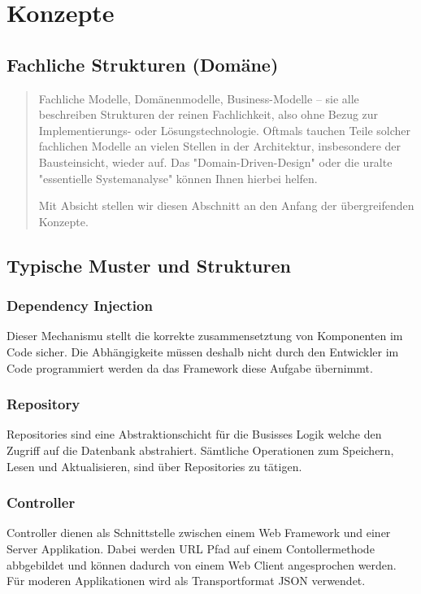\chapter{Konzepte}

\section{Fachliche Strukturen (Domäne)}

\begin{quote}
	Fachliche Modelle, Domänenmodelle, Business-Modelle – sie alle beschreiben Strukturen der reinen Fachlichkeit, also ohne Bezug zur Implementierungs- oder Lösungstechnologie.
	Oftmals tauchen Teile solcher fachlichen Modelle an vielen Stellen in der Architektur, insbesondere der Bausteinsicht, wieder auf. 
	Das "Domain-Driven-Design" oder die uralte "essentielle Systemanalyse" können Ihnen hierbei helfen.
	
	Mit Absicht stellen wir diesen Abschnitt an den Anfang der übergreifenden Konzepte.
\end{quote}

\section{Typische Muster und Strukturen}

\subsection{Dependency Injection}

Dieser Mechanismu stellt die korrekte zusammensetztung von Komponenten im Code sicher. Die Abhängigkeite müssen deshalb nicht durch den Entwickler im Code programmiert werden da das Framework diese Aufgabe übernimmt. 

\subsection{Repository}

Repositories sind eine Abstraktionschicht für die Busisses Logik welche den Zugriff auf die Datenbank abstrahiert. Sämtliche Operationen zum Speichern, Lesen und Aktualisieren, sind über Repositories zu tätigen. 

\subsection{Controller}

Controller dienen als Schnittstelle zwischen einem Web Framework und einer Server Applikation. Dabei werden URL Pfad auf einem Contollermethode abbgebildet und können dadurch von einem Web Client angesprochen werden. Für moderen Applikationen wird als Transportformat JSON verwendet. 

